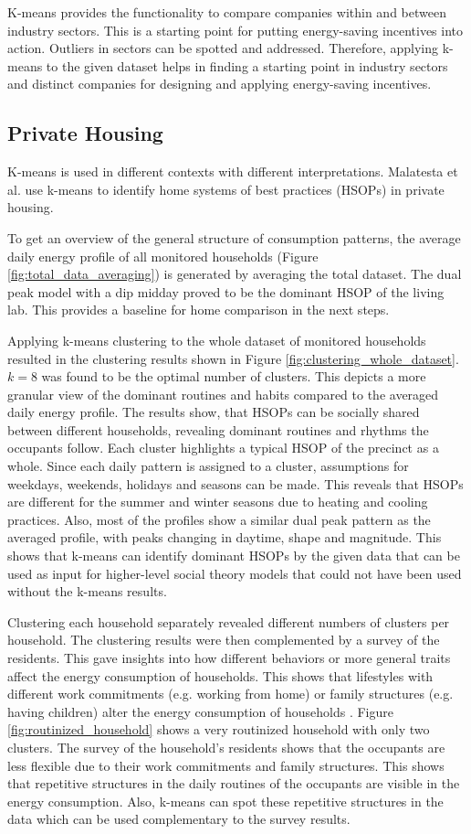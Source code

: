 K-means provides the functionality to compare companies within and between industry sectors.
This is a starting point for putting energy-saving incentives into action.
Outliers in sectors can be spotted and addressed.
Therefore, applying k-means to the given dataset helps in finding a starting point in industry sectors and distinct companies for designing and applying energy-saving incentives.

\subsection{Private Housing}
K-means is used in different contexts with different interpretations.
Malatesta et al. \cite{MAL-HBP} use k-means to identify home systems of best practices (HSOPs) in private housing.

To get an overview of the general structure of consumption patterns, the average daily energy profile of all monitored households (Figure \ref{fig:total_data_averaging}) is generated by averaging the total dataset.
The dual peak model with a dip midday proved to be the dominant HSOP of the living lab.
This provides a baseline for home comparison in the next steps.

Applying k-means clustering to the whole dataset of monitored households resulted in the clustering results shown in Figure \ref{fig:clustering_whole_dataset}.
$k=8$ was found to be the optimal number of clusters.
This depicts a more granular view of the dominant routines and habits compared to the averaged daily energy profile.
The results show, that HSOPs can be socially shared between different households, revealing dominant routines and rhythms the occupants follow.
Each cluster highlights a typical HSOP of the precinct as a whole.
Since each daily pattern is assigned to a cluster, assumptions for weekdays, weekends, holidays and seasons can be made. 
This reveals that HSOPs are different for the summer and winter seasons due to heating and cooling practices.
Also, most of the profiles show a similar dual peak pattern as the averaged profile, with peaks changing in daytime, shape and magnitude.
This shows that k-means can identify dominant HSOPs by the given data that can be used as input for higher-level social theory models that could not have been used without the k-means results.

Clustering each household separately revealed different numbers of clusters per household.
The clustering results were then complemented by a survey of the residents.
This gave insights into how different behaviors or more general traits affect the energy consumption of households.
This shows that lifestyles with different work commitments (e.g. working from home) or family structures (e.g. having children) alter the energy consumption of households \cite{KUR-HBP}.
Figure \ref{fig:routinized_household} shows a very routinized household with only two clusters.
The survey of the household's residents shows that the occupants are less flexible due to their work commitments and family structures.
This shows that repetitive structures in the daily routines of the occupants are visible in the energy consumption.
Also, k-means can spot these repetitive structures in the data which can be used complementary to the survey results.


